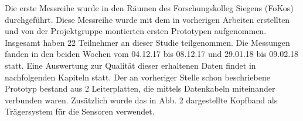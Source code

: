 


Die erste Messreihe wurde in den Räumen des Forschungskolleg Siegens (FoKos) durchgeführt. Diese Messreihe wurde mit dem in vorherigen Arbeiten erstellten und von der Projektgruppe montierten ersten Prototypen aufgenommen. Insgesamt haben 22 Teilnehmer an dieser Studie teilgenommen. Die Messungen fanden in den beiden Wochen vom 04.12.17 bis 08.12.17 und 29.01.18 bis 09.02.18 statt. Eine Auswertung zur Qualität dieser erhaltenen Daten findet in nachfolgenden Kapiteln statt. Der an vorheriger Stelle schon beschriebene Prototyp bestand aus 2 Leiterplatten, die mittels Datenkabeln miteinander verbunden waren. Zusätzlich wurde das in Abb. 2 dargestellte Kopfband als Trägersystem für die Sensoren verwendet.